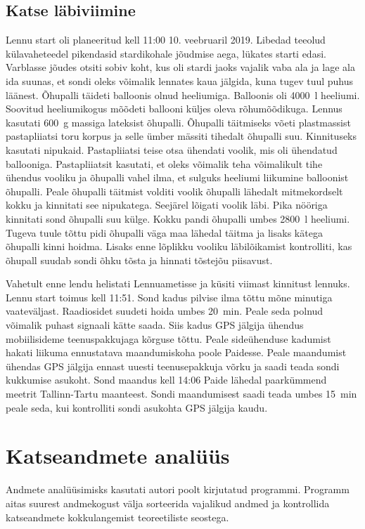 \documentclass{trkut}%
\begin{document}
\section{Katse läbiviimine}
Lennu start oli planeeritud kell 11:00 10. veebruaril 2019. Libedad teeolud külavaheteedel pikendasid stardikohale jõudmise aega, lükates starti edasi. Varblasse jõudes otsiti sobiv koht, kus oli stardi jaoks vajalik vaba ala ja lage ala ida suunas, et sondi oleks võimalik lennates kaua jälgida, kuna tugev tuul puhus läänest. Õhupalli täideti balloonis olnud heeliumiga. Balloonis oli \SI{4000}{l} heeliumi. Soovitud heeliumikogus mõõdeti ballooni küljes oleva rõhumõõdikuga. Lennus kasutati \SI{600}{g} massiga lateksist õhupalli. Õhupalli täitmiseks võeti plastmassist pastapliiatsi toru korpus ja selle ümber mässiti tihedalt õhupalli suu. Kinnituseks kasutati nipukaid. Pastapliiatsi teise otsa ühendati voolik, mis oli ühendatud ballooniga. Pastapliiatsit kasutati, et oleks võimalik teha võimalikult tihe ühendus vooliku ja õhupalli vahel ilma, et sulguks heeliumi liikumine balloonist õhupalli. Peale õhupalli täitmist volditi voolik õhupalli lähedalt mitmekordselt kokku ja kinnitati see nipukatega. Seejärel lõigati voolik läbi. Pika nööriga kinnitati sond õhupalli suu külge. Kokku pandi õhupalli umbes \SI{2800}{l} heeliumi. Tugeva tuule tõttu pidi õhupalli väga maa lähedal täitma ja lisaks kätega õhupalli kinni hoidma. Lisaks enne lõplikku vooliku läbilõikamist kontrolliti, kas õhupall suudab sondi õhku tõsta ja hinnati tõstejõu piisavust.

Vahetult enne lendu helistati Lennuametisse ja küsiti viimast kinnitust lennuks. Lennu start toimus kell 11:51. Sond kadus pilvise ilma tõttu mõne minutiga vaateväljast. Raadiosidet suudeti hoida umbes \SI{20}{min}. Peale seda polnud võimalik puhast signaali kätte saada. Siis kadus GPS jälgija ühendus mobiilisideme teenuspakkujaga kõrguse tõttu. Peale sideühenduse kadumist hakati liikuma ennustatava maandumiskoha poole Paidesse. Peale maandumist ühendas GPS jälgija ennast uuesti teenusepakkuja võrku ja saadi teada sondi kukkumise asukoht. Sond maandus kell 14:06 Paide lähedal paarkümmend meetrit Tallinn-Tartu maanteest. Sondi maandumisest saadi teada umbes \SI{15}{min} peale seda, kui kontrolliti sondi asukohta GPS jälgija kaudu.






\chapter{Katseandmete analüüs}
Andmete analüüsimisks kasutati autori poolt kirjutatud programmi. Programm aitas suurest andmekogust välja sorteerida vajalikud andmed ja kontrollida katseandmete kokkulangemist teoreetiliste seostega.
\end{document}
